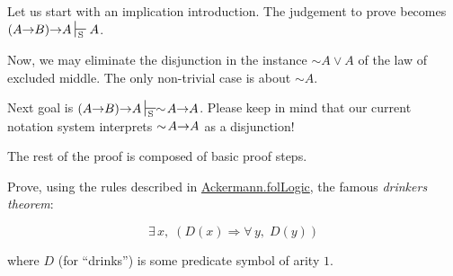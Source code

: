
Let us start with  an implication introduction. The judgement to prove becomes  $(A \arrow B) \arrow A \sdash A$.


Now, we may eliminate the disjunction 
in the instance $\sim A \vee A$ of the law of excluded middle.
The only non-trivial case is about $\sim A$.

\vspace{4pt}

Next goal is $(A \arrow B) \arrow A \sdash \sim\!A \arrow A$.
Please keep in mind  that our current notation system interprets
$\sim\!A \mbox{$\rightarrow$} A$ as a disjunction!



The rest of the proof is composed of basic proof steps.



\begin{exercise}
Prove, using the rules described in 
 \href{../theories/html/hydras.Ackermann.folLogic.html}{Ackermann.folLogic}, the famous \emph{drinkers theorem}:

$$\exists\,x,\; (D(x)\Longrightarrow \forall\,y,\; D(y))$$
\end{exercise}

where $D$ (for ``drinks'') is some predicate symbol of arity $1$.


